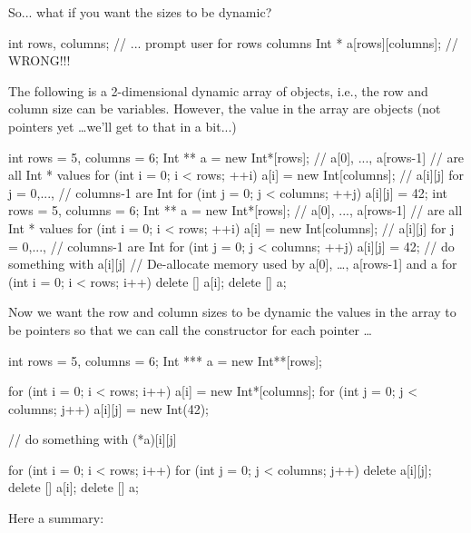 So... what if you want the sizes to be dynamic?
\begin{console}
int rows, columns;
// ... prompt user for rows columns
Int * a[rows][columns]; // WRONG!!!
\end{console}
The following is a 2-dimensional dynamic array of objects, i.e., the row
and column size can be variables. However, the value in the array are
objects (not pointers yet \ldots we'll get to that in
a bit...)
\begin{console}
int rows = 5, columns = 6;
Int ** a = new Int*[rows]; // a[0], ..., a[rows-1]
                           // are all Int * values
for (int i = 0; i < rows; ++i)
{   
    a[i] = new Int[columns]; // a[i][j] for j = 0,...,
                             // columns-1 are Int
    for (int j = 0; j < columns; ++j)
        a[i][j] = 42;
}
int rows = 5, columns = 6;
Int ** a = new Int*[rows]; // a[0], ..., a[rows-1]
                           // are all Int * values
for (int i = 0; i < rows; ++i)
{   
    a[i] = new Int[columns]; // a[i][j] for j = 0,...,
                             // columns-1 are Int
    for (int j = 0; j < columns; ++j)
        a[i][j] = 42;
}
// do something with a[i][j]
// De-allocate memory used by a[0], \ldots, a[rows-1] and a
for (int i = 0; i < rows; i++)
    delete [] a[i];
delete [] a;
\end{console}

Now we want the row and column sizes to be dynamic  the values in the array to be pointers so that we can call the constructor for each pointer \ldots

\begin{consolethree}[escapeinside=||]%
int rows = 5, columns = 6;
Int *** a = new Int**[rows];

for (int i = 0; i < rows; i++)
{   
    a[i] = new Int*[columns];
    for (int j = 0; j < columns; j++)
        a[i][j] = new Int(42);
}

// do something with (*a)[i][j]

for (int i = 0; i < rows; i++)
{   
    for (int j = 0; j < columns; j++)
    delete a[i][j];
    delete [] a[i];
}           
delete [] a;
\end{consolethree}

Here a summary:

